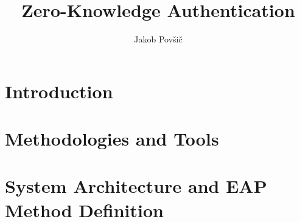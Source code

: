 \documentclass[12pt]{report}
\title{Zero-Knowledge Authentication}
\author{Jakob Povšič}
\theoremstyle{definition}
\begin{document}

\maketitle
\newpage

\tableofcontents
\newpage




\chapter{Introduction}
\label{chapter:1}


\chapter{Methodologies and Tools}
\label{chapter:2}







\chapter{System Architecture and EAP Method Definition}
\label{chapter:3}




%


\end{document}
